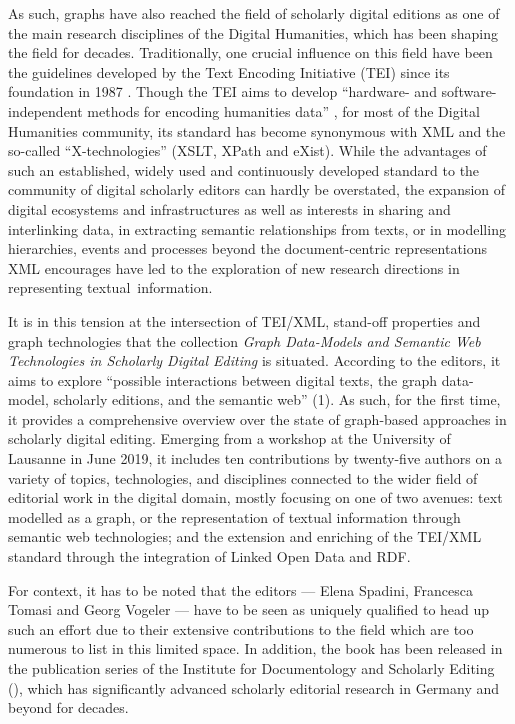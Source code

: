 \documentclass{article}
\begin{document}
As such, graphs have also reached the field of scholarly digital
editions as one of the main research disciplines of the Digital
Humanities, which has been shaping the field for decades. Traditionally,
one crucial influence on this field have been the guidelines developed
by the Text Encoding Initiative (TEI) since its foundation in 1987 \parencite{tei_consortium_tei_2007}. Though the
TEI aims to develop ``hardware- and software-independent methods for
encoding humanities data'' \parencite{tei_consortium_history_2023}, for most of the Digital Humanities
community, its standard has become synonymous with XML and the so-called
\mbox{``X-technologies''} (XSLT, XPath and eXist). While the advantages of
such an established, widely used and continuously developed standard to
the community of digital scholarly editors can hardly be overstated, the
expansion of digital ecosystems and infrastructures as well as interests
in sharing and interlinking data, in extracting semantic relationships
from texts, or in modelling hierarchies, events and processes beyond the
document-centric representations XML encourages have led to the
exploration of new research directions in representing \mbox{textual
information.}

It is in this tension at the intersection of TEI/XML, stand-off
properties and graph technologies that the collection \emph{Graph
Data-Models and Semantic Web Technologies in Scholarly Digital Editing}
is situated. According to the editors, it aims to explore ``possible
interactions between digital texts, the graph data-model, scholarly
editions, and the semantic web'' (1). As such, for the first time, it
provides a comprehensive overview over the state of graph-based
approaches in scholarly digital editing. Emerging from a workshop at the
University of Lausanne in June 2019, it includes ten contributions by
twenty-five authors on a variety of topics, technologies, and
disciplines connected to the wider field of editorial work in the
digital domain, mostly focusing on one of two avenues: text modelled as
a graph, or the representation of textual information through semantic
web technologies; and the extension and enriching of the TEI/XML
standard through the integration of Linked Open Data and RDF.

For context, it has to be noted that the editors --- Elena Spadini,
Francesca Tomasi and Georg Vogeler --- have to be seen as uniquely
qualified to head up such an effort due to their extensive contributions
to the field which are too numerous to list in this limited space. In
addition, the book has been released in the publication series of the
Institute for Documentology and Scholarly Editing (\citeyear{institute_of_documentary_and_scholarly_editing_schriftenreihe_2023}), which has significantly advanced
scholarly editorial research in Germany and beyond for decades.
\end{document}
